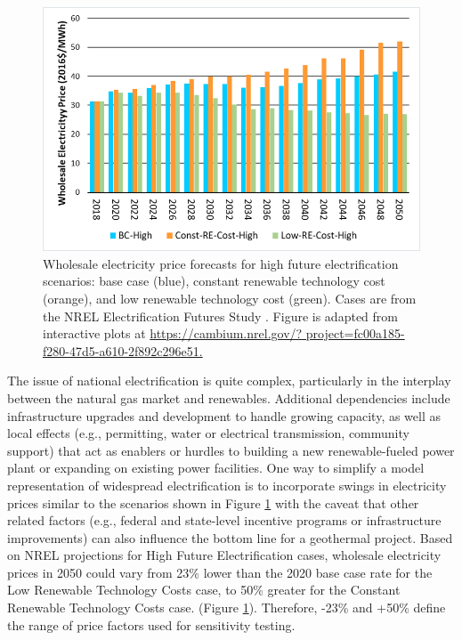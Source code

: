 \begin{figure}
\centering
\includegraphics[scale=0.65]{templates/images/Figure-EFS_SIPA_Results.png}
\singlespacing
\caption[Electrification price impact]{Wholesale electricity price forecasts for high future electrification scenarios: base case (blue), constant renewable technology cost (orange), and low renewable technology cost (green). Cases are from the NREL Electrification Futures Study \protect\citep{murphy_electrification_2021}. Figure is adapted from interactive plots at \url{https://cambium.nrel.gov/? project=fc00a185-f280-47d5-a610-2f892c296e51.}}
\label{fig:EFS_electricification}
\end{figure}
The issue of national electrification is quite complex, particularly in the interplay between the natural gas market and renewables. Additional dependencies include infrastructure upgrades and development to handle growing capacity, as well as local effects (e.g., permitting, water or electrical transmission, community support) that act as enablers or hurdles to building a new renewable-fueled power plant or expanding on existing power facilities. One way to simplify a model representation of widespread electrification is to incorporate swings in electricity prices similar to the scenarios shown in Figure \ref{fig:EFS_electricification} with the caveat that other related factors (e.g., federal and state-level incentive programs or infrastructure improvements) can also influence the bottom line for a geothermal project. Based on NREL projections for High Future Electrification cases, wholesale electricity prices in 2050 could vary from 23\% lower than the 2020 base case rate for the Low Renewable Technology Costs case, to 50\% greater for the Constant Renewable Technology Costs case. (Figure \ref{fig:EFS_electricification}). Therefore, -23\% and +50\% define the range of price factors used for sensitivity testing.


